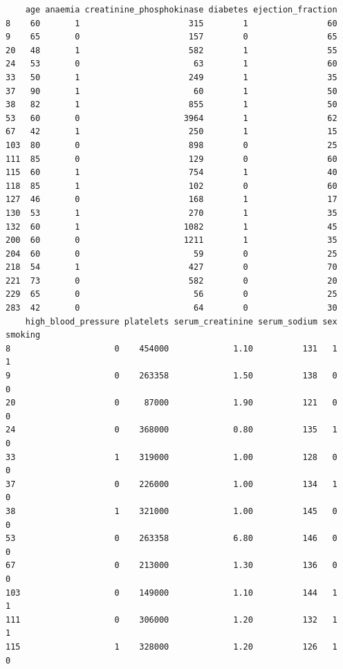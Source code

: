 \documentclass[
  letterpaper,
  DIV=11,
  numbers=noendperiod]{scrartcl}
\begin{document}
\begin{verbatim}
    age anaemia creatinine_phosphokinase diabetes ejection_fraction
8    60       1                      315        1                60
9    65       0                      157        0                65
20   48       1                      582        1                55
24   53       0                       63        1                60
33   50       1                      249        1                35
37   90       1                       60        1                50
38   82       1                      855        1                50
53   60       0                     3964        1                62
67   42       1                      250        1                15
103  80       0                      898        0                25
111  85       0                      129        0                60
115  60       1                      754        1                40
118  85       1                      102        0                60
127  46       0                      168        1                17
130  53       1                      270        1                35
132  60       1                     1082        1                45
200  60       0                     1211        1                35
204  60       0                       59        0                25
218  54       1                      427        0                70
221  73       0                      582        0                20
229  65       0                       56        0                25
283  42       0                       64        0                30
    high_blood_pressure platelets serum_creatinine serum_sodium sex smoking
8                     0    454000             1.10          131   1       1
9                     0    263358             1.50          138   0       0
20                    0     87000             1.90          121   0       0
24                    0    368000             0.80          135   1       0
33                    1    319000             1.00          128   0       0
37                    0    226000             1.00          134   1       0
38                    1    321000             1.00          145   0       0
53                    0    263358             6.80          146   0       0
67                    0    213000             1.30          136   0       0
103                   0    149000             1.10          144   1       1
111                   0    306000             1.20          132   1       1
115                   1    328000             1.20          126   1       0

\end{verbatim}
\end{document}
